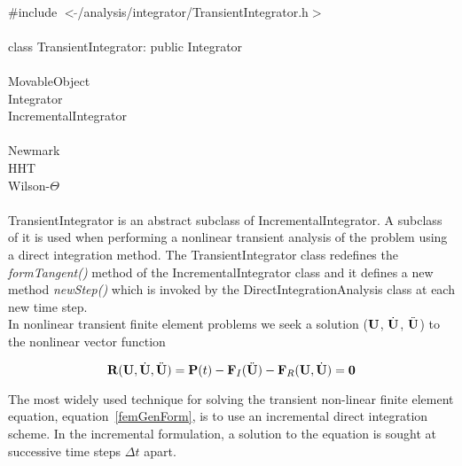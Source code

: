 
   \\
\indent \#include $<\tilde{ }$/analysis/integrator/TransientIntegrator.h$>$  \\

  \\
\indent class TransientIntegrator: public Integrator  \\

 \\
\indent MovableObject \\
\indent\indent Integrator \\
\indent\indent\indent IncrementalIntegrator \\
\indent\indent\indent{} \\
\indent\indent\indent\indent\indent Newmark \\
\indent\indent\indent\indent\indent HHT \\
\indent\indent\indent\indent\indent Wilson-$\Theta$ \\

 \\ 
\indent TransientIntegrator is an abstract subclass of IncrementalIntegrator.
A subclass of it is used when performing a nonlinear transient
analysis of the problem using a direct integration method. The
TransientIntegrator class redefines the {\em formTangent()} method of
the IncrementalIntegrator class and it defines a new method {\em
newStep()} which is invoked by the DirectIntegrationAnalysis class at
each new time step.  \\

In nonlinear transient finite element problems we seek a solution
(${\bf U}$, $\dot {{\bf U}}$, $\ddot {{\bf U}}$) to the nonlinear vector function

\begin{equation}
{\bf R}({\bf U},\dot{\bf U}, \ddot{\bf U}) = {\bf P}(t) - {\bf F}_I(\ddot{\bf U}) - {\bf F}_R({\bf U}, \dot{\bf U}) = {\bf 0}
\label{femGenForm}
\end{equation}


The most widely used technique for solving the transient non-linear 
finite element equation, equation~\ref{femGenForm}, is to use an
incremental direct integration scheme. In the incremental formulation,
a solution to the equation is sought at successive time steps $\Delta
t$ apart.  

